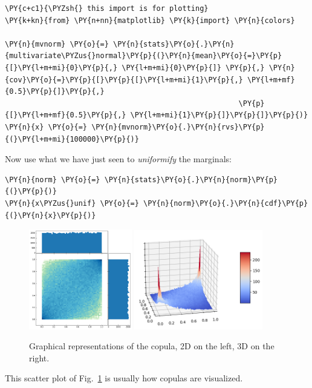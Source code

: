 \begin{tcolorbox}[breakable, size=fbox, boxrule=1pt, pad at break*=1mm,colback=cellbackground, colframe=cellborder]
\begin{Verbatim}[commandchars=\\\{\}]
\PY{c+c1}{\PYZsh{} this import is for plotting}
\PY{k+kn}{from} \PY{n+nn}{matplotlib} \PY{k}{import} \PY{n}{colors}

\PY{n}{mvnorm} \PY{o}{=} \PY{n}{stats}\PY{o}{.}\PY{n}{multivariate\PYZus{}normal}\PY{p}{(}\PY{n}{mean}\PY{o}{=}\PY{p}{[}\PY{l+m+mi}{0}\PY{p}{,} \PY{l+m+mi}{0}\PY{p}{]} \PY{p}{,} \PY{n}{cov}\PY{o}{=}\PY{p}{[}\PY{p}{[}\PY{l+m+mi}{1}\PY{p}{,} \PY{l+m+mf}{0.5}\PY{p}{]}\PY{p}{,}
                                                      \PY{p}{[}\PY{l+m+mf}{0.5}\PY{p}{,} \PY{l+m+mi}{1}\PY{p}{]}\PY{p}{]}\PY{p}{)}
\PY{n}{x} \PY{o}{=} \PY{n}{mvnorm}\PY{o}{.}\PY{n}{rvs}\PY{p}{(}\PY{l+m+mi}{100000}\PY{p}{)}
\end{Verbatim}
\end{tcolorbox}

    Now use what we have just seen to \emph{uniformify} the marginals:

    \begin{tcolorbox}[breakable, size=fbox, boxrule=1pt, pad at break*=1mm,colback=cellbackground, colframe=cellborder]
\begin{Verbatim}[commandchars=\\\{\}]
\PY{n}{norm} \PY{o}{=} \PY{n}{stats}\PY{o}{.}\PY{n}{norm}\PY{p}{(}\PY{p}{)}
\PY{n}{x\PYZus{}unif} \PY{o}{=} \PY{n}{norm}\PY{o}{.}\PY{n}{cdf}\PY{p}{(}\PY{n}{x}\PY{p}{)}
\end{Verbatim}
\end{tcolorbox}

    \begin{figure}
    \centering
    \includegraphics[width=0.4\textwidth]{copula_files/copula_11_0.png}
    \hspace{5mm}
    \includegraphics[width=0.5\textwidth]{copula_3d.png}
    \caption{Graphical representations of the copula, 2D on the left, 3D on the right.}
    \label{fig:copula}
    \end{figure}
    This scatter plot of Fig.~\ref{fig:copula} is usually how copulas are visualized. 
    
